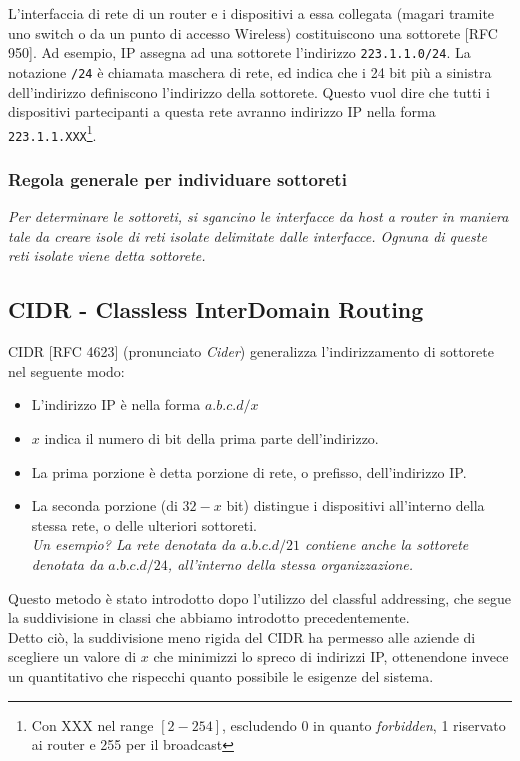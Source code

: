 L'interfaccia di rete di un router e i dispositivi a essa collegata (magari tramite uno switch o da un punto di accesso Wireless) costituiscono una sottorete [RFC 950]. Ad esempio, IP assegna ad una sottorete l'indirizzo \verb|223.1.1.0/24|. La notazione \verb|/24| è chiamata maschera di rete, ed indica che i 24 bit più a sinistra dell'indirizzo definiscono l'indirizzo della sottorete. Questo vuol dire che tutti i dispositivi partecipanti a questa rete avranno indirizzo IP nella forma \verb|223.1.1.XXX|\footnote{Con XXX nel range $[2-254]$, escludendo $0$ in quanto \textit{forbidden}, 1 riservato ai router e 255 per il broadcast}.



\subsubsection{Regola generale per individuare sottoreti}
\textit{Per determinare le sottoreti, si sgancino le interfacce da host a router in maniera tale da creare isole di reti isolate delimitate dalle interfacce. Ognuna di queste reti isolate viene detta sottorete.}

\newpage
\subsection{CIDR - Classless InterDomain Routing}
CIDR [RFC 4623] (pronunciato \textit{Cider}) generalizza l'indirizzamento di sottorete nel seguente modo:

\begin{itemize}
	\item L'indirizzo IP è nella forma $a.b.c.d/x$
	\item $x$ indica il numero di bit della prima parte dell'indirizzo.
	\item La prima porzione è detta porzione di rete, o prefisso, dell'indirizzo IP. 
	\item La seconda porzione (di $32-x$ bit) distingue i dispositivi all'interno della stessa rete, o delle ulteriori sottoreti.\\
	\textit{Un esempio? La rete denotata da $a.b.c.d/21$ contiene anche la sottorete denotata da $a.b.c.d/24$, all'interno della stessa organizzazione.}
\end{itemize}

Questo metodo è stato introdotto dopo l'utilizzo del classful addressing, che segue la suddivisione in classi che abbiamo introdotto precedentemente.\\ Detto ciò, la suddivisione meno rigida del CIDR ha permesso alle aziende di scegliere un valore di $x$ che minimizzi lo spreco di indirizzi IP, ottenendone invece un quantitativo che rispecchi quanto possibile le esigenze del sistema.

